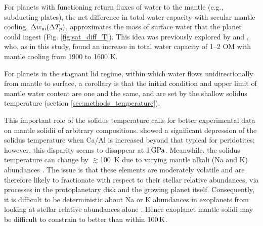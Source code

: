For planets with functioning return fluxes of water to the mantle (e.g., subducting plates), the net difference in total water capacity with secular mantle cooling, $\Delta w_{\rm m} (\Delta T_p)$, approximates the mass of surface water that the planet could ingest (Fig. \ref{fig:sat_diff_T}). This idea was previously explored by \citet{dong_constraining_2021, dong_water_2022} and \citet{andrault_mantle_2022}, who, as in this study, found an increase in total water capacity of 1--2 OM with mantle cooling from 1900 to 1600 K. %


For planets in the stagnant lid regime, within which water flows unidirectionally from mantle to surface, a corollary is that the initial condition and upper limit of mantle water content are one and the same, and are set by the shallow solidus temperature (section \ref{sec:methods_temperature}). 

This important role of the solidus temperature calls for better experimental data on mantle solidii of arbitrary compositions. \citet{brugman_experimental_2021} showed a significant depression of the solidus temperature when Ca/Al is increased beyond that typical for peridotites; however, this disparity seems to disappear at $1\,{\rm GPa}$. Meanwhile, the solidus temperature can change by $\gtrsim$100~K due to varying mantle alkali (Na and K) abundances \citep{hirschmann_mantle_2000}. The issue is that these elements are moderately volatile and are therefore likely to fractionate with respect to their stellar relative abundances, via processes in the protoplanetary disk and the growing planet itself. Consequently, it is difficult to be deterministic about Na or K abundances in exoplanets from looking at stellar relative abundances alone \citep[see][]{wang_detailed_2022}. Hence exoplanet mantle solidi may be difficult to constrain to better than within $100\,{\rm K}$. 




